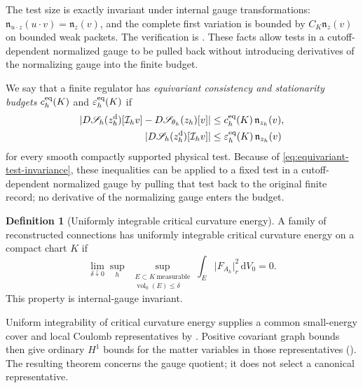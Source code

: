 \documentclass[11pt]{article}
\numberwithin{equation}{section}
\theoremstyle{definition}
\newtheorem{definition}[definition]{Definition}
\theoremstyle{remark}
\newcommand{\dd}{\mathrm d}
\newcommand{\abs}[1]{\lvert#1\rvert}
\newcommand{\Sact}{\mathscr S}
\newcommand{\dV}{\dd V}
\begin{document}
The test size is exactly invariant under internal gauge transformations:
$\mathfrak n_{u\cdot z}(u\cdot v)=\mathfrak n_z(v)$, and the complete
first variation is bounded by $C_K\mathfrak n_z(v)$ on bounded weak packets.
The verification is . These facts allow tests in
a cutoff-dependent normalized gauge to be pulled back without introducing
derivatives of the normalizing gauge into the finite budget.

We say that a finite regulator has \emph{equivariant consistency and
stationarity budgets} $c_h^{\rm eq}(K)$ and
$\varepsilon_h^{\rm eq}(K)$ if
\begin{align}
 \abs{D\Sact_h(z_h^{\rm d})[\mathcal I_hv]
      -D\Sact_{\theta_h}(z_h)[v]}
 &\le c_h^{\rm eq}(K)\,\mathfrak n_{z_h}(v),
 \label{eq:equivariant-consistency}\\
 \abs{D\Sact_h(z_h^{\rm d})[\mathcal I_hv]}
 &\le\varepsilon_h^{\rm eq}(K)\,\mathfrak n_{z_h}(v)
 \label{eq:equivariant-stationarity}
\end{align}
for every smooth compactly supported physical test.  Because of
\eqref{eq:equivariant-test-invariance}, these inequalities can be applied to a
fixed test in a cutoff-dependent normalized gauge by pulling that test back to
the original finite record; no derivative of the normalizing gauge enters the
budget.

\begin{definition}[Uniformly integrable critical curvature energy]
\label{def:critical-curvature-ui}
A family of reconstructed connections has uniformly integrable critical
curvature energy on a compact chart $K$ if
\begin{equation}
 \lim_{\delta\downarrow0}\sup_h\ \sup_{\substack{E\subset K\ \text{measurable}\\
                         \operatorname{vol}_0(E)\le\delta}}
 \int_E\abs{F_{A_h}}_r^2\,\dV_0=0.
 \label{eq:critical-curvature-ui}
\end{equation}
This property is internal-gauge invariant.
\end{definition}

Uniform integrability of critical curvature energy supplies a common
small-energy cover and local Coulomb representatives by
. Positive covariant graph bounds then give
ordinary $H^1$ bounds for the matter variables in those representatives
(). The resulting theorem concerns the
gauge quotient; it does not select a canonical representative.
\end{document}
